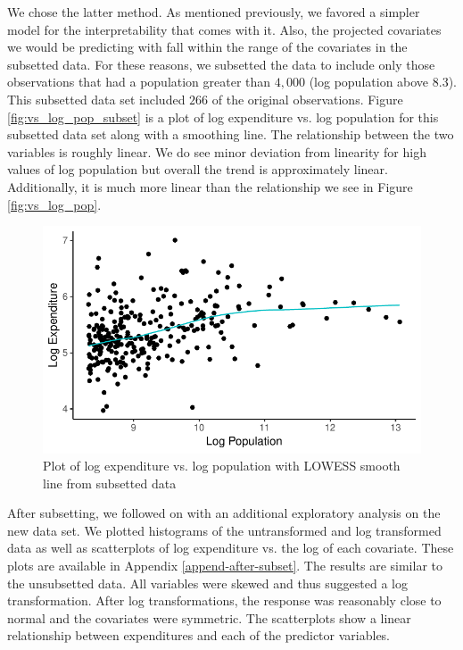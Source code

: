 \documentclass{article}\usepackage[]{graphicx}\usepackage[]{color}
\makeatletter
\def\maxwidth{ %
  \ifdim\Gin@nat@width>\linewidth
    \linewidth
  \else
    \Gin@nat@width
  \fi
}
\newenvironment{knitrout}{}{} %
\makeatother
\begin{document}
We chose the latter method. As mentioned previously, we favored a simpler model for the interpretability that comes with it. Also, the projected covariates we would be predicting with fall within the range of the covariates in the subsetted data. For these reasons, we subsetted the data to include only those observations that had a population greater than $4,000$ (log population above $8.3$). This subsetted data set included $266$ of the original observations. Figure \ref{fig:vs_log_pop_subset} is a plot of log expenditure vs. log population for this subsetted data set along with a smoothing line. The relationship between the two variables is roughly linear. We do see minor deviation from linearity for high values of log population but overall the trend is approximately linear. Additionally, it is much more linear than the relationship we see in Figure \ref{fig:vs_log_pop}.

\begin{knitrout}
\color{fgcolor}\begin{figure}[h]
\includegraphics[width=\maxwidth]{figure/r_fig_vs_log_pop_subset-1} \caption{\label{fig:vs_log_pop_subset} Plot of log expenditure vs. log population with LOWESS smooth line from subsetted data}\label{fig:r fig_vs_log_pop_subset}
\end{figure}


\end{knitrout}


After subsetting, we followed on with an additional exploratory analysis on the new data set. We plotted histograms of the untransformed and log transformed data as well as scatterplots of log expenditure vs. the log of each covariate. These plots are available in Appendix \ref{append-after-subset}. The results are similar to the unsubsetted data. All variables were skewed and thus suggested a log transformation. After log transformations, the response was reasonably close to normal and the covariates were symmetric. The scatterplots show a linear relationship between expenditures and each of the predictor variables.
\end{document}
